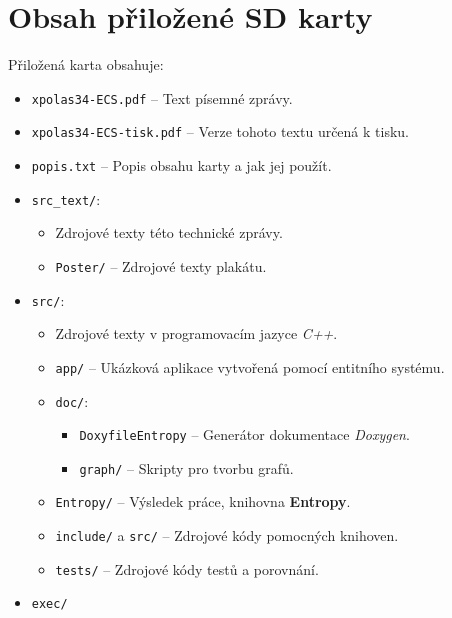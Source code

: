 
\chapter{Obsah přiložené SD karty}
\label{Att:Card}

Přiložená karta obsahuje:
\begin{itemize}
	\item \texttt{xpolas34-ECS.pdf} -- Text písemné zprávy.
	\item \texttt{xpolas34-ECS-tisk.pdf} -- Verze tohoto textu určená k tisku.
	\item \texttt{popis.txt} -- Popis obsahu karty a jak jej použít.
	\item \texttt{src\_text/}:
	\begin{itemize}
		\item Zdrojové texty této technické zprávy.
		\item \texttt{Poster/} -- Zdrojové texty plakátu.
	\end{itemize}
	\item \texttt{src/}:
	\begin{itemize}
		\item Zdrojové texty v programovacím jazyce \emph{C++}.
		\item \texttt{app/} -- Ukázková aplikace vytvořená pomocí entitního systému.
		\item \texttt{doc/}:
		\begin{itemize}
			\item \texttt{DoxyfileEntropy} -- Generátor dokumentace \emph{Doxygen}.
			\item \texttt{graph/} -- Skripty pro tvorbu grafů.
		\end{itemize}
		\item \texttt{Entropy/} -- Výsledek práce, knihovna \textbf{Entropy}.
		\item \texttt{include/} a \texttt{src/} -- Zdrojové kódy pomocných knihoven.
		\item \texttt{tests/} -- Zdrojové kódy testů a porovnání.
	\end{itemize}
	\item \texttt{exec/}
	\begin{itemize}

\end{itemize}
\end{itemize}

